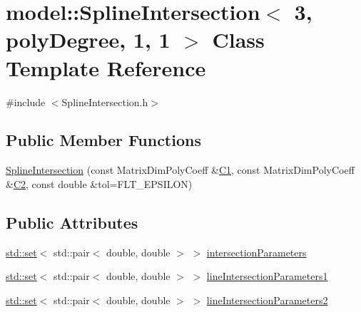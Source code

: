 \hypertarget{classmodel_1_1_spline_intersection_3_013_00_01poly_degree_00_011_00_011_01_4}{}\section{model\+:\+:Spline\+Intersection$<$ 3, poly\+Degree, 1, 1 $>$ Class Template Reference}
\label{classmodel_1_1_spline_intersection_3_013_00_01poly_degree_00_011_00_011_01_4}


{\ttfamily \#include $<$Spline\+Intersection.\+h$>$}

\subsection*{Public Member Functions}
\begin{DoxyCompactItemize}
\item 
\hyperlink{classmodel_1_1_spline_intersection_3_013_00_01poly_degree_00_011_00_011_01_4_a0461b1638abd4736c86d13a72f177c00}{Spline\+Intersection} (const Matrix\+Dim\+Poly\+Coeff \&\hyperlink{_cubic_spline_intersection_8m_ab4c2e29f0027cddbda43c092248a07b9}{C1}, const Matrix\+Dim\+Poly\+Coeff \&\hyperlink{_cubic_spline_intersection_8m_aba5e864526cbaa667bca74e2d1d453f0}{C2}, const double \&tol=F\+L\+T\+\_\+\+E\+P\+S\+I\+L\+O\+N)
\end{DoxyCompactItemize}
\subsection*{Public Attributes}
\begin{DoxyCompactItemize}
\item 
\hyperlink{plot_cells_8m_a03623d69001c34fc77654be29bdc3d8a}{std\+::set}$<$ std\+::pair$<$ double, double $>$ $>$ \hyperlink{classmodel_1_1_spline_intersection_3_013_00_01poly_degree_00_011_00_011_01_4_a7ee855d10ea13b6cad3b0b843a98fac3}{intersection\+Parameters}
\item 
\hyperlink{plot_cells_8m_a03623d69001c34fc77654be29bdc3d8a}{std\+::set}$<$ std\+::pair$<$ double, double $>$ $>$ \hyperlink{classmodel_1_1_spline_intersection_3_013_00_01poly_degree_00_011_00_011_01_4_a890cf5ca64741e442cc4edc7d6d2d9bd}{line\+Intersection\+Parameters1}
\item 
\hyperlink{plot_cells_8m_a03623d69001c34fc77654be29bdc3d8a}{std\+::set}$<$ std\+::pair$<$ double, double $>$ $>$ \hyperlink{classmodel_1_1_spline_intersection_3_013_00_01poly_degree_00_011_00_011_01_4_ad540f302cf83a2e908ddbefb1f493591}{line\+Intersection\+Parameters2}
\end{DoxyCompactItemize}


